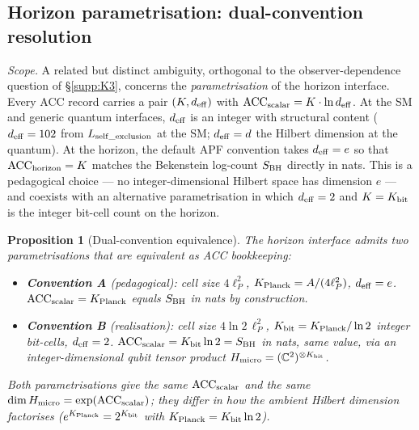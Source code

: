 \documentclass[11pt]{article}
\theoremstyle{plain}
\newtheorem{proposition}[theorem]{Proposition}
\theoremstyle{definition}
\theoremstyle{remark}
\begin{document}
\subsection{Horizon parametrisation: dual-convention resolution}\label{supp:K4}

\noindent\textit{Scope.}  A related but distinct ambiguity, orthogonal to the observer-dependence question of \S\ref{supp:K3}, concerns the \emph{parametrisation} of the horizon interface.  Every ACC record carries a pair $(K, d_{\rm eff})$ with $\mathrm{ACC}_{\rm scalar} = K \cdot \ln d_{\rm eff}$.  At the SM and generic quantum interfaces, $d_{\rm eff}$ is an integer with structural content ($d_{\rm eff} = 102$ from $L_{\rm self\_exclusion}$ at the SM; $d_{\rm eff} = d$ the Hilbert dimension at the quantum).  At the horizon, the default APF convention takes $d_{\rm eff} = e$ so that $\mathrm{ACC}_{\rm horizon} = K$ matches the Bekenstein log-count $S_{\rm BH}$ directly in nats.  This is a pedagogical choice --- no integer-dimensional Hilbert space has dimension $e$ --- and coexists with an alternative parametrisation in which $d_{\rm eff} = 2$ and $K = K_{\rm bit}$ is the integer bit-cell count on the horizon.

\begin{proposition}[Dual-convention equivalence]\label{prop:dual_convention}
The horizon interface admits two parametrisations that are equivalent as ACC bookkeeping:
\begin{itemize}[leftmargin=2.5em,itemsep=2pt]
  \item \textbf{Convention A} (pedagogical): cell size $4\ell_P^2$, $K_{\rm Planck} = A/(4\ell_P^2)$, $d_{\rm eff} = e$.  $\mathrm{ACC}_{\rm scalar} = K_{\rm Planck}$ equals $S_{\rm BH}$ in nats by construction.
  \item \textbf{Convention B} (realisation): cell size $4 \ln 2 \, \ell_P^2$, $K_{\rm bit} = K_{\rm Planck} / \ln 2$ integer bit-cells, $d_{\rm eff} = 2$.  $\mathrm{ACC}_{\rm scalar} = K_{\rm bit} \ln 2 = S_{\rm BH}$ in nats, same value, via an integer-dimensional qubit tensor product $H_{\rm micro} = (\mathbb{C}^2)^{\otimes K_{\rm bit}}$.
\end{itemize}
Both parametrisations give the same $\mathrm{ACC}_{\rm scalar}$ and the same $\dim H_{\rm micro} = \exp(\mathrm{ACC}_{\rm scalar})$; they differ in how the ambient Hilbert dimension factorises ($e^{K_{\rm Planck}} = 2^{K_{\rm bit}}$ with $K_{\rm Planck} = K_{\rm bit} \ln 2$).
\end{proposition}
\end{document}
